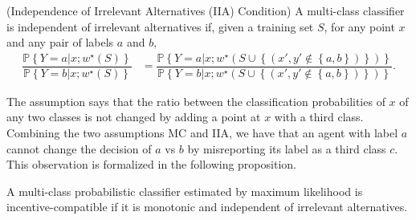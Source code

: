 \documentclass{article}
\begin{document}
\begin{df} \label{df:iia} 
(Independence of Irrelevant Alternatives (IIA) Condition) A multi-class classifier is independent of irrelevant alternatives if, given a training set $S $, for any point $x $ and any pair of labels $a $ and $b, $
\begin{align*}
\dfrac{\mathbb{P}\left\{Y = a | x ; w^\star \left(S\right)\right\}}{\mathbb{P}\left\{Y = b | x ; w^\star \left(S\right)\right\}} &= \dfrac{\mathbb{P}\left\{Y = a | x ; w^\star \left(S \cup \left\{\left(x', y' \notin \left\{a, b\right\}\right)\right\}\right)\right\}}{\mathbb{P}\left\{Y = b | x ; w^\star \left(S \cup \left\{\left(x', y' \notin \left\{a, b\right\}\right)\right\}\right)\right\}}.
\end{align*}\end{df}
The assumption says that the ratio between the classification probabilities of $x $ of any two classes is not changed by adding a point at $x $ with a third class.
\newline \newline
Combining the two assumptions MC and IIA, we have that an agent with label $a $ cannot change the decision of $a $ vs $b $ by misreporting its label as a third class $c $. This observation is formalized in the following proposition.
\newline \newline
\begin{thm} \label{thm:margin} 
A multi-class probabilistic classifier estimated by maximum likelihood is incentive-compatible if it is monotonic and independent of irrelevant alternatives.
\end{thm}
\end{document}
